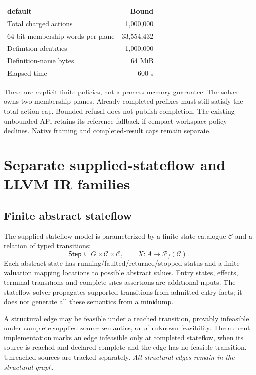 \documentclass[11pt,a4paper]{article}
\newcommand{\ty}[1]{\mathsf{#1}}
\newcommand{\fin}{\mathcal{P}_{\!f}}
\newcommand{\code}[1]{\texttt{\detokenize{#1}}}
\begin{document}
\begin{center}
\begin{tabular}{@{}lr@{}}\toprule
\code{CompletionLimits} default & Bound\\\midrule
Total charged actions & 1,000,000\\
64-bit membership words per plane & 33,554,432\\
Definition identities & 1,000,000\\
Definition-name bytes & 64 MiB\\
Elapsed time & 600 s\\\bottomrule
\end{tabular}
\end{center}
These are explicit finite policies, not a process-memory guarantee. The solver
owns two membership planes. Already-completed prefixes must still satisfy the
total-action cap. Bounded refusal does not publish completion. The existing
unbounded \code{finish} API retains its reference fallback if compact workspace
policy declines. Native framing and completed-result caps remain separate.

\section{Separate supplied-stateflow and LLVM IR families}
\label{app:separate}
\subsection{Finite abstract stateflow}
The supplied-stateflow model is parameterized by a finite state catalogue
$\mathcal C$ and a relation of typed transitions:
\[
 \ty{Step}\subseteq G\times\mathcal C\times\mathcal C,
 \qquad X:A\to\fin(\mathcal C).
\]
Each abstract state has running/faulted/returned/stopped status and a finite
valuation mapping locations to possible abstract values. Entry states,
effects, terminal transitions and complete-sites assertions are additional
inputs. The stateflow solver propagates supported transitions from admitted
entry facts; it does not generate all these semantics from a minidump.

A structural edge may be feasible under a reached transition, provably
infeasible under complete supplied source semantics, or of unknown feasibility.
The current implementation marks an edge infeasible only at completed
stateflow, when its source is reached and declared complete and the edge has
no feasible transition. Unreached sources are tracked separately.
\emph{All structural edges remain in the structural graph.}
\end{document}
